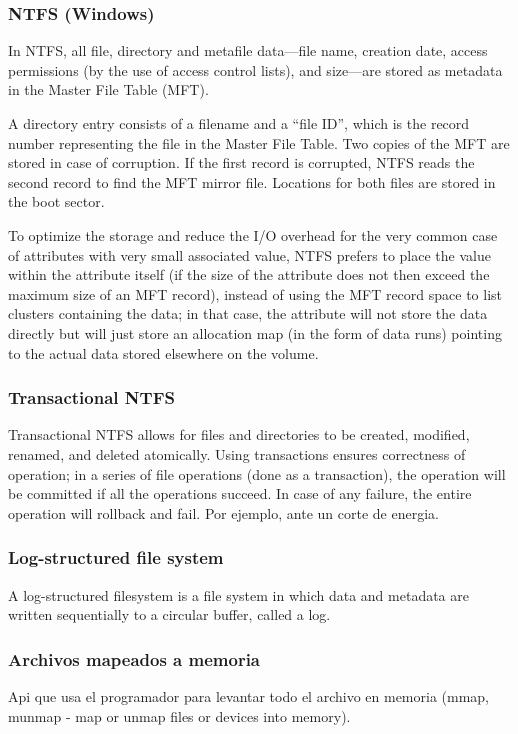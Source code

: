 \documentclass[a4paper, twoside]{article}
\begin{document}
\subsubsection{NTFS (Windows)}
In NTFS, all file, directory and metafile data—file name, creation date, access permissions (by the use of access control lists), and size—are stored as metadata in the Master File Table (MFT). 

A directory entry consists of a filename and a ``file ID'', which is the record number representing the file in the Master File Table. Two copies of the MFT are stored in case of corruption. If the first record is corrupted, NTFS reads the second record to find the MFT mirror file. Locations for both files are stored in the boot sector.

To optimize the storage and reduce the I/O overhead for the very common case of attributes with very small associated value, NTFS prefers to place the value within the attribute itself (if the size of the attribute does not then exceed the maximum size of an MFT record), instead of using the MFT record space to list clusters containing the data; in that case, the attribute will not store the data directly but will just store an allocation map (in the form of data runs) pointing to the actual data stored elsewhere on the volume.

\subsubsection{Transactional NTFS}
Transactional NTFS allows for files and directories to be created, modified, renamed, and deleted atomically. Using transactions ensures correctness of operation; in a series of file operations (done as a transaction), the operation will be committed if all the operations succeed. In case of any failure, the entire operation will rollback and fail. Por ejemplo, ante un corte de energia.

\subsubsection{Log-structured file system}
A log-structured filesystem is a file system in which data and metadata are written sequentially to a circular buffer, called a log.

\subsubsection{Archivos mapeados a memoria}
Api que usa el programador para levantar todo el archivo en memoria (mmap, munmap - map or unmap files or devices into memory).
\end{document}
